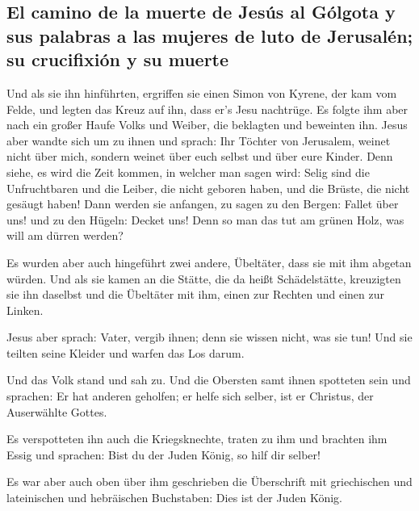 \hypertarget{el-camino-de-la-muerte-de-jesuxfas-al-guxf3lgota-y-sus-palabras-a-las-mujeres-de-luto-de-jerusaluxe9n-su-crucifixiuxf3n-y-su-muerte}{%
\subsection{El camino de la muerte de Jesús al Gólgota y sus palabras a
las mujeres de luto de Jerusalén; su crucifixión y su
muerte}\label{el-camino-de-la-muerte-de-jesuxfas-al-guxf3lgota-y-sus-palabras-a-las-mujeres-de-luto-de-jerusaluxe9n-su-crucifixiuxf3n-y-su-muerte}}

 Und als sie ihn hinführten, ergriffen sie einen Simon
von Kyrene, der kam vom Felde, und legten das Kreuz auf ihn, dass er's
Jesu nachtrüge.  Es folgte ihm aber nach ein großer Haufe
Volks und Weiber, die beklagten und beweinten ihn.  Jesus
aber wandte sich um zu ihnen und sprach: Ihr Töchter von Jerusalem,
weinet nicht über mich, sondern weinet über euch selbst und über eure
Kinder.  Denn siehe, es wird die Zeit kommen, in welcher
man sagen wird: Selig sind die Unfruchtbaren und die Leiber, die nicht
geboren haben, und die Brüste, die nicht gesäugt haben! 
Dann werden sie anfangen, zu sagen zu den Bergen: Fallet über uns! und
zu den Hügeln: Decket uns!  Denn so man das tut am grünen
Holz, was will am dürren werden?

 Es wurden aber auch hingeführt zwei andere, Übeltäter,
dass sie mit ihm abgetan würden.  Und als sie kamen an
die Stätte, die da heißt Schädelstätte, kreuzigten sie ihn daselbst und
die Übeltäter mit ihm, einen zur Rechten und einen zur Linken.

 Jesus aber sprach: Vater, vergib ihnen; denn sie wissen
nicht, was sie tun! Und sie teilten seine Kleider und warfen das Los
darum.

 Und das Volk stand und sah zu. Und die Obersten samt
ihnen spotteten sein und sprachen: Er hat anderen geholfen; er helfe
sich selber, ist er Christus, der Auserwählte Gottes.

 Es verspotteten ihn auch die Kriegsknechte, traten zu
ihm und brachten ihm Essig  und sprachen: Bist du der
Juden König, so hilf dir selber!

 Es war aber auch oben über ihm geschrieben die
Überschrift mit griechischen und lateinischen und hebräischen
Buchstaben: Dies ist der Juden König.

